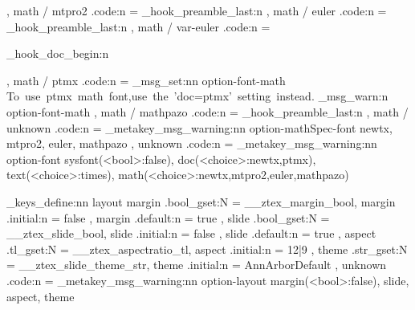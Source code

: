 {{  },
  math / mtpro2   .code:n       = { 
    \ztex_hook_preamble_last:n 
      {
      } 
  },
  math / euler    .code:n       = { 
    \ztex_hook_preamble_last:n 
      {
      } 
  },
  math / var-euler .code:n       = {
    \usepackage[OT1]{eulervm}
    \ztex_hook_doc_begin:n
      {
        \DeclareRobustCommand\int {\new@int}
      }
  },
  math / ptmx     .code:n       = { 
    \ztex_msg_set:nn {option-font-math}
      {To~use~ptmx~math~font,use~the~'doc=ptmx'~setting~instead.}
    \ztex_msg_warn:n {option-font-math}
  },
  math / mathpazo .code:n       = { 
    \ztex_hook_preamble_last:n 
      {
        \let\cmrrmdefault\rmdefault
        \let\cmrsfdefault\sfdefault
        \let\cmrttdefault\ttdefault
        \RequirePackage{mathpazo}
        \let\rmdefault\cmrrmdefault
        \let\sfdefault\cmrsfdefault
        \let\ttdefault\cmrttdefault
      }
  },
  math / unknown  .code:n       = { 
    \ztex_metakey_msg_warning:nn 
      {option-mathSpec-font}
      {newtx, mtpro2, euler, mathpazo} 
  },
  unknown         .code:n      = { 
    \ztex_metakey_msg_warning:nn 
      { option-font }
      {
        sysfont(<bool>:false), 
        doc(<choice>:newtx,ptmx), 
        text(<choice>:times), 
        math(<choice>:newtx,mtpro2,euler,mathpazo)
      }
  }
}


\ztex_keys_define:nn { layout }{
  margin          .bool_gset:N  = \g__ztex_margin_bool,
  margin          .initial:n    = { false },
  margin          .default:n    = { true },
  slide           .bool_gset:N  = \g__ztex_slide_bool,
  slide           .initial:n    = { false },
  slide           .default:n    = { true },
  aspect          .tl_gset:N    = \g__ztex_aspectratio_tl,
  aspect          .initial:n    = { 12|9 },
  theme           .str_gset:N   = \g__ztex_slide_theme_str,
  theme           .initial:n    = { AnnArborDefault },
  unknown         .code:n       = { 
    \ztex_metakey_msg_warning:nn {option-layout}
      {margin(<bool>:false), slide, aspect, theme} 
  }
}


